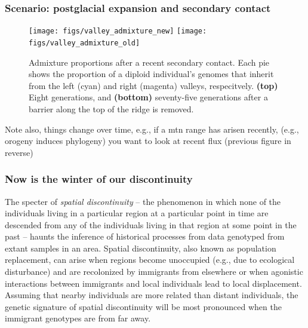 \documentclass{ar-1col}
\newcommand{\g}[1]{{\color{blue}{#1}}}
\newcommand{\todo}[1]{{\textbf{\color{red}{#1}}}}
\begin{document}
\todo{read through and edit}

\subsubsection{Scenario: postglacial expansion and secondary contact}

\todo{How much does each individual inherit from each glacial refugium? Relate to admixture}

\g{to do}
\begin{figure}[ht]
    \centering
        \texttt{[image: figs/valley\_admixture\_new]}
        \texttt{[image: figs/valley\_admixture\_old]}
        \caption{
            Admixture proportions after a recent secondary contact.
            Each pie shows the proportion of a diploid individual's genomes
            that inherit from the left (cyan) and right (magenta) valleys, respecitvely.
            \textbf{(top)} Eight generations, and
            \textbf{(bottom)} seventy-five generations 
            after a barrier along the top of the ridge is removed.
        }
        \label{postglacial_expansion}
\end{figure}

Note also,
things change over time, e.g., if a mtn range has arisen recently, 
(e.g., orogeny induces phylogeny)
you want to look at recent flux (previous figure in reverse)

\subsubsection{Now is the winter of our discontinuity}

The specter of \textit{spatial discontinuity} --
the phenomenon in which none of the individuals 
living in a particular region at a particular point in time 
are descended from any of the individuals living in that region 
at some point in the past
-- haunts the inference of historical processes
from data genotyped from extant samples in an area.
Spatial discontinuity, 
also known as population replacement, 
can arise when regions become unoccupied
(e.g., due to ecological disturbance) 
and are recolonized by immigrants from elsewhere or 
when agonistic interactions between immigrants and local individuals 
lead to local displacement. 
Assuming that nearby individuals are more related than distant individuals, 
the genetic signature of spatial discontinuity will be most pronounced 
when the immigrant genotypes are from far away.
\end{document}
